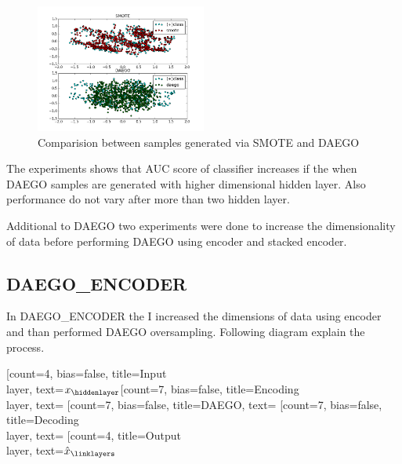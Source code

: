 \documentclass[a4paper,11pt]{report}
\begin{document}
\begin{figure}[ht]
\begin{center}
  \includegraphics[width=0.5\textwidth]{sm_dg}
\end{center}
    \caption{Comparision between samples generated via SMOTE and DAEGO}
  \label{fig:smdg}
\end{figure}
The experiments shows that AUC score of classifier increases if the when DAEGO samples are generated with higher dimensional hidden layer. Also performance do not vary after more than two hidden layer. 


Additional to DAEGO two experiments were done to increase the dimensionality of data before performing DAEGO using encoder and stacked encoder. 

\subsection*{DAEGO\_ENCODER}


In DAEGO\_ENCODER the I increased the dimensions of data using encoder and than performed DAEGO oversampling. Following diagram explain the process.
\begin{center}
\begin{neuralnetwork}[height=8, layertitleheight=1cm, nodespacing=1cm, layerspacing=2cm]
		\newcommand{\nodetextclear}[2]{}
		\newcommand{\nodetextx}[2]{$x_#2$}
		\newcommand{\nodetexty}[2]{$\hat{x}_#2$}
		[count=4, bias=false, title=Input\\layer, text=\nodetextx]
		\hiddenlayer[count=7, bias=false, title=Encoding\\layer, text=\nodetextclear] \linklayers
		\hiddenlayer[count=7, bias=false, title=DAEGO, text=\nodetextclear] \linklayers
		\hiddenlayer[count=7, bias=false, title=Decoding\\layer, text=\nodetextclear] \linklayers
		\outputlayer[count=4, title=Output\\layer, text=\nodetexty] \linklayers
	\end{neuralnetwork}
\end{center}
\end{document}
